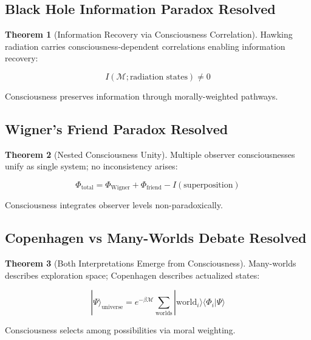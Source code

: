 \documentclass[12pt,a4paper]{article}
\theoremstyle{definition}
\newtheorem{theorem}{Theorem}[section]
\begin{document}
\subsection{Black Hole Information Paradox Resolved}

\begin{theorem}[Information Recovery via Consciousness Correlation]
Hawking radiation carries consciousness-dependent correlations enabling information recovery:

\begin{equation}
I(\mathcal{M}; \text{radiation states}) \neq 0
\end{equation}

Consciousness preserves information through morally-weighted pathways.
\end{theorem}

\subsection{Wigner's Friend Paradox Resolved}

\begin{theorem}[Nested Consciousness Unity]
Multiple observer consciousnesses unify as single system; no inconsistency arises:

\begin{equation}
\Phi_{\text{total}} = \Phi_{\text{Wigner}} + \Phi_{\text{friend}} - I(\text{superposition})
\end{equation}

Consciousness integrates observer levels non-paradoxically.
\end{theorem}

\subsection{Copenhagen vs Many-Worlds Debate Resolved}

\begin{theorem}[Both Interpretations Emerge from Consciousness]
Many-worlds describes exploration space; Copenhagen describes actualized states:

\begin{equation}
|\Psi\rangle_{\text{universe}} = e^{-\beta \mathcal{M}} \sum_{\text{worlds}} |\text{world}_i\rangle\langle\Phi_i|\Psi\rangle
\end{equation}

Consciousness selects among possibilities via moral weighting.
\end{theorem}
\end{document}
